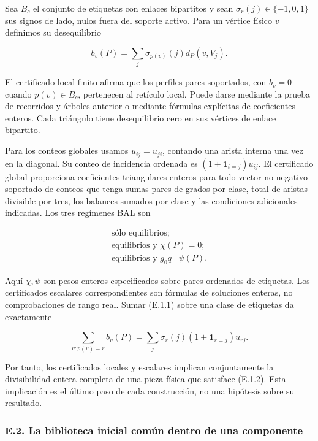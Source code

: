 \documentclass[spanish,11pt,a4paper]{article}
\begin{document}
Sea \(B_c\) el conjunto de etiquetas con enlaces bipartitos y sean \(\sigma_r(j)\in\{-1,0,1\}\) sus signos de lado, nulos fuera del soporte activo. Para un vértice físico \(v\) definimos su desequilibrio

\[b_v(P)=\sum_j\sigma_{p(v)}(j)d_P(v,V_j).
\tag{E.1.1}\]

El certificado local finito afirma que los perfiles pares soportados, con \(b_v=0\) cuando \(p(v)\in B_c\), pertenecen al retículo local. Puede darse mediante la prueba de recorridos y árboles anterior o mediante fórmulas explícitas de coeficientes enteros. Cada triángulo tiene desequilibrio cero en sus vértices de enlace bipartito.

Para los conteos globales usamos \(u_{ij}=u_{ji}\), contando una arista interna una vez en la diagonal. Su conteo de incidencia ordenada es \((1+\mathbf1_{i=j})u_{ij}\). El certificado global proporciona coeficientes triangulares enteros para todo vector no negativo soportado de conteos que tenga sumas pares de grados por clase, total de aristas divisible por tres, los balances sumados por clase y las condiciones adicionales indicadas. Los tres regímenes BAL son

\[\begin{gathered}
\text{sólo equilibrios};\\
\text{equilibrios y }\chi(P)=0;\\
\text{equilibrios y }g_0q\mid\psi(P).
\end{gathered}
\tag{E.1.2}\]

Aquí \(\chi,\psi\) son pesos enteros especificados sobre pares ordenados de etiquetas. Los certificados escalares correspondientes son fórmulas de soluciones enteras, no comprobaciones de rango real. Sumar (E.1.1) sobre una clase de etiquetas da exactamente

\[\sum_{v:p(v)=r}b_v(P)
=\sum_j\sigma_r(j)(1+\mathbf1_{r=j})u_{rj}.
\tag{E.1.3}\]

Por tanto, los certificados locales y escalares implican conjuntamente la divisibilidad entera completa de una pieza física que satisface (E.1.2). Esta implicación es el último paso de cada construcción, no una hipótesis sobre su resultado.

\subsubsection{E.2. La biblioteca inicial común dentro de una componente}\label{e.2.-la-biblioteca-inicial-comuxfan-dentro-de-una-componente}
\end{document}

